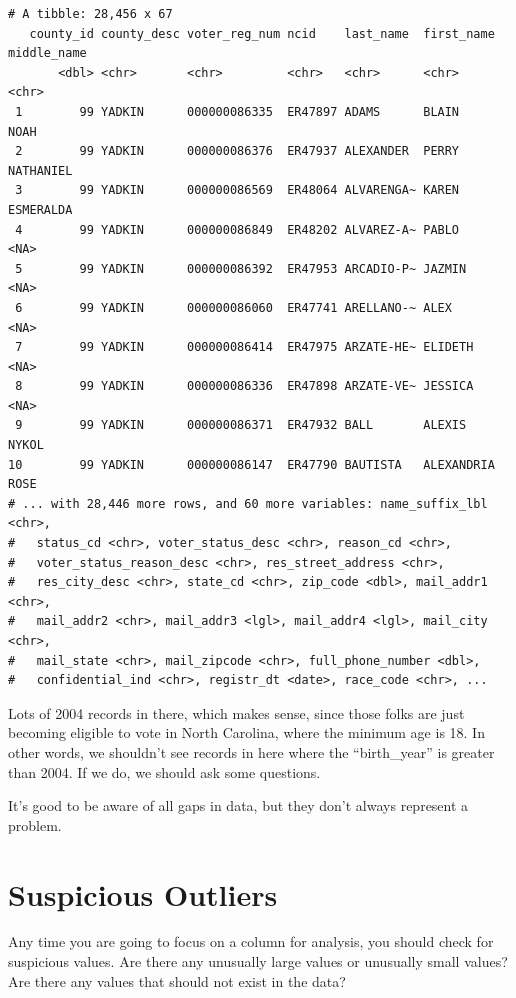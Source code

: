 \documentclass[
  letterpaper,
  DIV=11,
  numbers=noendperiod]{scrreprt}
\begin{document}
\begin{verbatim}
# A tibble: 28,456 x 67
   county_id county_desc voter_reg_num ncid    last_name  first_name middle_name
       <dbl> <chr>       <chr>         <chr>   <chr>      <chr>      <chr>      
 1        99 YADKIN      000000086335  ER47897 ADAMS      BLAIN      NOAH       
 2        99 YADKIN      000000086376  ER47937 ALEXANDER  PERRY      NATHANIEL  
 3        99 YADKIN      000000086569  ER48064 ALVARENGA~ KAREN      ESMERALDA  
 4        99 YADKIN      000000086849  ER48202 ALVAREZ-A~ PABLO      <NA>       
 5        99 YADKIN      000000086392  ER47953 ARCADIO-P~ JAZMIN     <NA>       
 6        99 YADKIN      000000086060  ER47741 ARELLANO-~ ALEX       <NA>       
 7        99 YADKIN      000000086414  ER47975 ARZATE-HE~ ELIDETH    <NA>       
 8        99 YADKIN      000000086336  ER47898 ARZATE-VE~ JESSICA    <NA>       
 9        99 YADKIN      000000086371  ER47932 BALL       ALEXIS     NYKOL      
10        99 YADKIN      000000086147  ER47790 BAUTISTA   ALEXANDRIA ROSE       
# ... with 28,446 more rows, and 60 more variables: name_suffix_lbl <chr>,
#   status_cd <chr>, voter_status_desc <chr>, reason_cd <chr>,
#   voter_status_reason_desc <chr>, res_street_address <chr>,
#   res_city_desc <chr>, state_cd <chr>, zip_code <dbl>, mail_addr1 <chr>,
#   mail_addr2 <chr>, mail_addr3 <lgl>, mail_addr4 <lgl>, mail_city <chr>,
#   mail_state <chr>, mail_zipcode <chr>, full_phone_number <dbl>,
#   confidential_ind <chr>, registr_dt <date>, race_code <chr>, ...
\end{verbatim}

Lots of 2004 records in there, which makes sense, since those folks are
just becoming eligible to vote in North Carolina, where the minimum age
is 18. In other words, we shouldn't see records in here where the
``birth\_year'' is greater than 2004. If we do, we should ask some
questions.

It's good to be aware of all gaps in data, but they don't always
represent a problem.

\hypertarget{suspicious-outliers}{%
\section{Suspicious Outliers}\label{suspicious-outliers}}

Any time you are going to focus on a column for analysis, you should
check for suspicious values. Are there any unusually large values or
unusually small values? Are there any values that should not exist in
the data?
\end{document}
